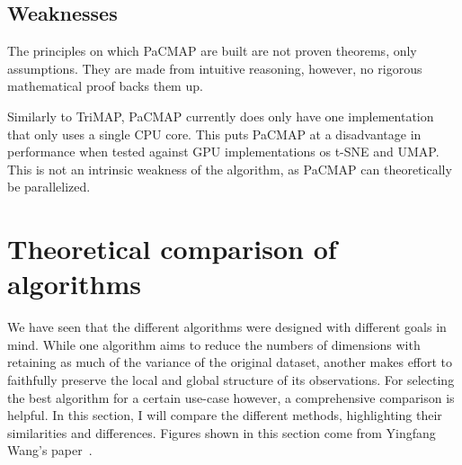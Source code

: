 \subsection{Weaknesses}

The principles on which PaCMAP are built are not proven theorems, only assumptions. They are made from intuitive reasoning, however, no rigorous mathematical proof backs them up.

Similarly to TriMAP, PaCMAP currently does only have one implementation that only uses a single CPU core. This puts PaCMAP at a disadvantage in performance when tested against GPU implementations os t-SNE and UMAP. This is not an intrinsic weakness of the algorithm, as PaCMAP can theoretically be parallelized.

\section{Theoretical comparison of algorithms}

We have seen that the different algorithms were designed with different goals in mind. While one algorithm aims to reduce the numbers of dimensions with retaining as much of the variance of the original dataset, another makes effort to faithfully preserve the local and global structure of its observations. For selecting the best algorithm for a certain use-case however, a comprehensive comparison is helpful. In this section, I will compare the different methods, highlighting their similarities and differences. Figures shown in this section come from Yingfang Wang's paper~\cite{bib:pacmap}.

